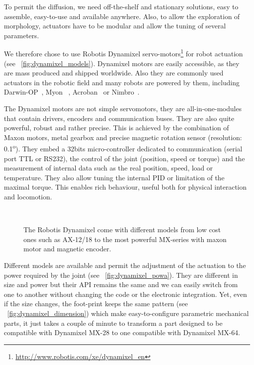 
To permit the diffusion, we need off-the-shelf and stationary solutions, easy to assemble, easy-to-use and available anywhere. Also, to allow the exploration of morphology, actuators have to be modular and allow the tuning of several parameters.

We therefore chose to use Robotis Dynamixel servo-motors\footnote{\url{http://www.robotis.com/xe/dynamixel_en}} for robot actuation (see \figurename~\ref{fig:dynamixel_models}). Dynamixel motors are easily accessible, as they are mass produced and shipped worldwide. Also they are commonly used actuators in the robotic field and many robots are powered by them, including Darwin-OP~\parencite{ha2011development}, Myon~\parencite{hild2012myon} , Acroban~\parencite{ly2011bio} or Nimbro~\parencite{schwarznimbro}.

The Dynamixel motors are not simple servomotors, they are all-in-one-modules that contain drivers, encoders and communication buses. They are also quite powerful, robust and rather precise. This is achieved by the combination of Maxon motors, metal gearbox and precise magnetic rotation sensor (resolution: 0.1\textsuperscript{o}). They embed a 32bits micro-controller dedicated to communication (serial port TTL or RS232), the control of the joint (position, speed or torque) and the measurement of internal data such as the real position, speed, load or temperature. They also allow tuning the internal PID or limitation of the maximal torque. This enables rich behaviour, useful both for physical interaction and locomotion.


\begin{figure}[tb]
\centering
    \hfil
    \\
    \caption{The Robotis Dynamixel come with different models from low cost ones such as AX-12/18 to the most powerful MX-series with maxon motor and magnetic encoder.}
    \label{fig:dynamixel_serie}
\end{figure}

Different models are available and permit the adjustment of the actuation to the power required by the joint (see \figurename~\ref{fig:dynamixel_powa}). They are different in size and power but their API remains the same and we can easily switch from one to another without changing the code or the electronic integration. Yet, even if the size changes, the foot-print keeps the same pattern (see \figurename~\ref{fig:dynamixel_dimension}) which make easy-to-configure parametric mechanical parts, it just takes a couple of minute to transform a part designed to be compatible with Dynamixel MX-28 to one compatible with Dynamixel MX-64.


